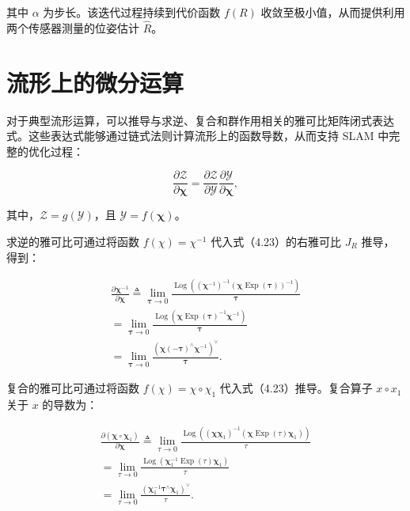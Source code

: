 其中 $\alpha$ 为步长。该迭代过程持续到代价函数 $f ( R )$ 收敛至极小值，从而提供利用两个传感器测量的位姿估计 $\hat { R }$。

\section{流形上的微分运算}

对于典型流形运算，可以推导与求逆、复合和群作用相关的雅可比矩阵闭式表达式。这些表达式能够通过链式法则计算流形上的函数导数，从而支持 SLAM 中完整的优化过程：

\begin{equation}
\frac {\partial \mathcal {Z}}{\partial \boldsymbol {\chi}} = \frac {\partial \mathcal {Z}}{\partial \boldsymbol {\mathcal {Y}}} \frac {\partial \boldsymbol {\mathcal {Y}}}{\partial \boldsymbol {\chi}},\tag{4.31}
\end{equation}

其中，$\mathcal{Z} = g(\mathcal{Y})$，且 $\mathcal{Y} = f(\boldsymbol{\chi})$。

求逆的雅可比可通过将函数 $f ( \chi ) = \chi ^ { - 1 }$ 代入式（4.23）的右雅可比 $\scriptstyle J _ { R }$ 推导，得到：

\begin{equation}
\begin{array}{l} \frac {\partial \boldsymbol {\chi} ^ {- 1}}{\partial \boldsymbol {\chi}} \triangleq \lim _ {\boldsymbol {\tau} \to 0} \frac {\operatorname{Log} \left((\boldsymbol {\chi} ^ {- 1}) ^ {- 1} (\boldsymbol {\chi} \operatorname{Exp} (\boldsymbol {\tau})) ^ {- 1}\right)}{\boldsymbol {\tau}} \\ = \lim _ {\boldsymbol {\tau} \to 0} \frac {\operatorname{Log} \left(\boldsymbol {\chi} \operatorname{Exp} (\boldsymbol {\tau}) ^ {- 1} \boldsymbol {\chi} ^ {- 1}\right)}{\boldsymbol {\tau}} \\ = \lim _ {\boldsymbol {\tau} \to 0} \frac {(\boldsymbol {\chi} (- \boldsymbol {\tau}) ^ {\wedge} \boldsymbol {\chi} ^ {- 1}) ^ {\vee}}{\boldsymbol {\tau}}. \end{array}\tag{4.32}
\end{equation}

复合的雅可比可通过将函数 $f ( \chi ) = \chi \circ \chi _ { 1 }$ 代入式（4.23）推导。复合算子 $x \circ x _ { 1 }$ 关于 $x$ 的导数为：

\begin{equation}
\begin{array}{l} \frac {\partial (\boldsymbol {\chi} \circ \boldsymbol {\chi} _ {1})}{\partial \boldsymbol {\chi}} \triangleq \lim _ {\tau \to 0} \frac {\operatorname{Log} \left((\boldsymbol {\chi} \boldsymbol {\chi} _ {1}) ^ {- 1} (\boldsymbol {\chi} \operatorname{Exp} (\tau) \boldsymbol {\chi} _ {1})\right)}{\tau} \\ = \lim _ {\tau \to 0} \frac {\operatorname{Log} \left(\boldsymbol {\chi} _ {1} ^ {- 1} \operatorname{Exp} (\tau) \boldsymbol {\chi} _ {1}\right)}{\tau} \\ = \lim _ {\tau \to 0} \frac {(\boldsymbol {\chi} _ {1} ^ {- 1} \boldsymbol {\tau} ^ {\wedge} \boldsymbol {\chi} _ {1}) ^ {\vee}}{\tau}. \end{array}\tag{4.33}
\end{equation}

